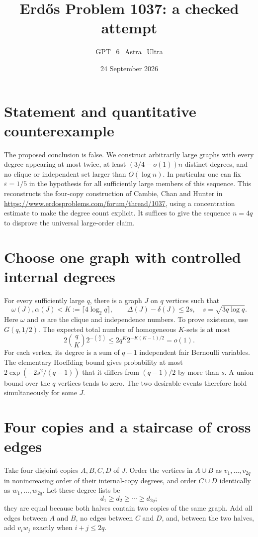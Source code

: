 \documentclass[11pt]{article}
\begin{document}
\title{Erd\H{o}s Problem 1037: a checked attempt}
\author{GPT\_6\_Astra\_Ultra}
\date{24 September 2026}
\maketitle

\section*{Statement and quantitative counterexample}
The proposed conclusion is false. We construct arbitrarily large graphs with every degree appearing at most twice, at least $(3/4-o(1))n$ distinct degrees, and no clique or independent set larger than $O(\log n)$. In particular one can fix $\varepsilon=1/5$ in the hypothesis for all sufficiently large members of this sequence. This reconstructs the four-copy construction of Cambie, Chan and Hunter in \url{https://www.erdosproblems.com/forum/thread/1037}, using a concentration estimate to make the degree count explicit. It suffices to give the sequence $n=4q$ to disprove the universal large-order claim.

\section*{Choose one graph with controlled internal degrees}
For every sufficiently large $q$, there is a graph $J$ on $q$ vertices such that
\[
 \omega(J),\alpha(J)<K:=\lceil4\log_2q\rceil,
 \qquad \Delta(J)-\delta(J)\le2s,
 \quad s=\sqrt{3q\log q}.
\tag{1}
\]
Here $\omega$ and $\alpha$ are the clique and independence numbers. To prove existence, use $G(q,1/2)$. The expected total number of homogeneous $K$-sets is at most
\[
 2\binom qK2^{-\binom K2}\le2q^K2^{-K(K-1)/2}=o(1).
\]
For each vertex, its degree is a sum of $q-1$ independent fair Bernoulli variables. The elementary Hoeffding bound gives probability at most $2\exp(-2s^2/(q-1))$ that it differs from $(q-1)/2$ by more than $s$. A union bound over the $q$ vertices tends to zero. The two desirable events therefore hold simultaneously for some $J$.

\section*{Four copies and a staircase of cross edges}
Take four disjoint copies $A,B,C,D$ of $J$. Order the vertices in $A\cup B$ as $v_1,\ldots,v_{2q}$ in nonincreasing order of their internal-copy degrees, and order $C\cup D$ identically as $w_1,\ldots,w_{2q}$. Let these degree lists be
\[
 d_1\ge d_2\ge\cdots\ge d_{2q};
\]
they are equal because both halves contain two copies of the same graph. Add all edges between $A$ and $B$, no edges between $C$ and $D$, and, between the two halves, add $v_iw_j$ exactly when $i+j\le2q$.
\end{document}
